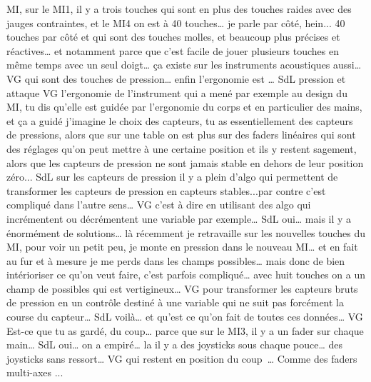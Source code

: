 MI, sur le MI1, il y a trois touches qui sont en plus des touches raides avec des jauges contraintes, et le MI4 on est à 40 touches… je parle par côté, hein... 40 touches par côté et qui sont des touches molles, et beaucoup plus précises et réactives… et notamment parce que c'est facile de jouer plusieurs touches en même temps avec un seul doigt… ça existe sur les instruments acoustiques aussi… 
VG qui sont des touches de pression… enfin l'ergonomie est … 
SdL pression et attaque 
VG l'ergonomie de l'instrument qui a mené par exemple au design du MI, tu dis qu'elle est guidée par l'ergonomie du corps et en particulier des mains, et ça a guidé j'imagine le choix des capteurs, tu as essentiellement des capteurs de pressions, alors que sur une table on est plus sur des faders linéaires qui sont des réglages qu'on peut mettre à une certaine position et ils y restent sagement, alors que les capteurs de pression ne sont jamais stable en dehors de leur position zéro...  
SdL sur les capteurs de pression il y a plein d'algo qui permettent de transformer les capteurs de pression en capteurs stables...par contre c'est compliqué dans l'autre sens… 
VG c'est à dire en utilisant des algo qui incrémentent ou décrémentent une variable par exemple… 
SdL oui… mais il y a énormément de solutions… là récemment je retravaille sur les nouvelles touches du MI, pour voir un petit peu, je monte en pression dans le nouveau MI… et en fait au fur et à mesure je me perds dans les champs possibles…  mais donc de bien intérioriser ce qu'on veut faire, c'est parfois compliqué… avec huit touches on a un champ de possibles qui est vertigineux… 
VG pour transformer les capteurs bruts de pression en un contrôle destiné à une variable qui ne suit pas forcément la course du capteur… 
SdL voilà… et qu'est ce qu'on fait de toutes ces données… 
VG Est-ce que tu as gardé, du coup… parce que sur le MI3, il y a un fader sur chaque main… 
SdL oui… on a empiré… la il y a des joysticks sous chaque pouce… des joysticks sans ressort… 
VG qui restent en position du coup … Comme des faders multi-axes ... 
